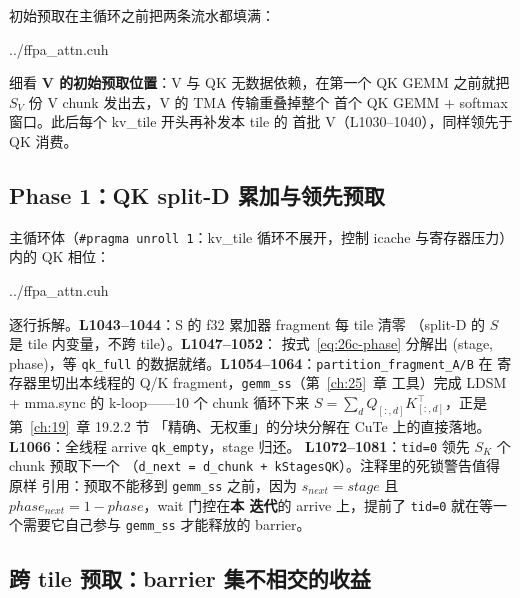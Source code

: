 初始预取在主循环之前把两条流水都填满：

\begin{lstinputlisting}[linerange={1008-1026},firstnumber=auto,
  title={ffpa\_attn.cuh L1008-1026（初始预取：QK 填满 $S_K$，V 填满 $S_V$）}]{../ffpa_attn.cuh}
\end{lstinputlisting}

细看 \textbf{V 的初始预取位置}：V 与 QK 无数据依赖，在第一个
QK GEMM 之前就把 $S_V$ 份 V chunk 发出去，V 的 TMA 传输重叠掉整个
首个 QK GEMM + softmax 窗口。此后每个 kv\_tile 开头再补发本 tile 的
首批 V（L1030--1040），同样领先于 QK 消费。

\subsection{Phase 1：QK split-D 累加与领先预取}\label{sec:26c-qk}

主循环体（\texttt{\#pragma unroll 1}：kv\_tile 循环不展开，控制
icache 与寄存器压力）内的 QK 相位：

\begin{lstinputlisting}[linerange={1043-1082},firstnumber=auto,
  title={ffpa\_attn.cuh L1043-1082（Phase 1：chunk 流水上的 $S=\sum_d Q_d K_d^\top$）}]{../ffpa_attn.cuh}
\end{lstinputlisting}

逐行拆解。\textbf{L1043--1044}：S 的 f32 累加器 fragment 每 tile 清零
（split-D 的 $S$ 是 tile 内变量，不跨 tile）。\textbf{L1047--1052}：
按式~\eqref{eq:26c-phase} 分解出 (stage, phase)，等 \texttt{qk\_full}
的数据就绪。\textbf{L1054--1064}：\texttt{partition\_fragment\_A/B} 在
寄存器里切出本线程的 Q/K fragment，\texttt{gemm\_ss}（第~\ref{ch:25}~章
工具）完成 LDSM + mma.sync 的 k-loop——10 个 chunk 循环下来
$S = \sum_{d} Q_{[:,d]} K_{[:,d]}^\top$，正是第~\ref{ch:19}~章 19.2.2 节
「精确、无权重」的分块分解在 CuTe 上的直接落地。
\textbf{L1066}：全线程 arrive \texttt{qk\_empty}，stage 归还。
\textbf{L1072--1081}：\texttt{tid=0} 领先 $S_K$ 个 chunk 预取下一个
（\texttt{d\_next = d\_chunk + kStagesQK}）。注释里的死锁警告值得原样
引用：预取不能移到 \texttt{gemm\_ss} 之前，因为
$s_{next} = stage$ 且 $phase_{next} = 1 - phase$，wait 门控在\textbf{本
迭代}的 arrive 上，提前了 \texttt{tid=0} 就在等一个需要它自己参与
\texttt{gemm\_ss} 才能释放的 barrier。

\subsection{跨 tile 预取：barrier 集不相交的收益}\label{sec:26c-prefetch}

